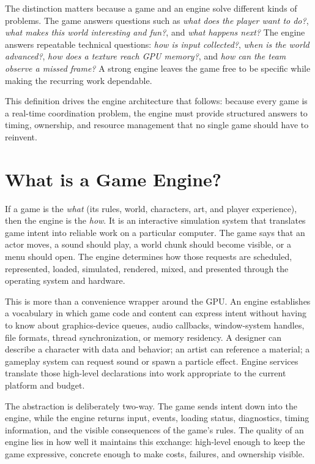 \documentclass[
  11pt,
  letterpaper,
  DIV=11,
  numbers=noendperiod,
  twoside,
  open=right]{scrreprt}
\begin{document}
The distinction matters because a game and an engine solve different
kinds of problems. The game answers questions such as \emph{what does
the player want to do?}, \emph{what makes this world interesting and
fun?}, and \emph{what happens next?} The engine answers repeatable
technical questions: \emph{how is input collected?}, \emph{when is the
world advanced?}, \emph{how does a texture reach GPU memory?}, and
\emph{how can the team observe a missed frame?} A strong engine leaves
the game free to be specific while making the recurring work dependable.

This definition drives the engine architecture that follows: because
every game is a real-time coordination problem, the engine must provide
structured answers to timing, ownership, and resource management that no
single game should have to reinvent.

\section{What is a Game Engine?}\label{what-is-a-game-engine}

If a game is the \emph{what} (its rules, world, characters, art, and
player experience), then the engine is the \emph{how}. It is an
interactive simulation system that translates game intent into reliable
work on a particular computer. The game says that an actor moves, a
sound should play, a world chunk should become visible, or a menu should
open. The engine determines how those requests are scheduled,
represented, loaded, simulated, rendered, mixed, and presented through
the operating system and hardware.

This is more than a convenience wrapper around the GPU. An engine
establishes a vocabulary in which game code and content can express
intent without having to know about graphics-device queues, audio
callbacks, window-system handles, file formats, thread synchronization,
or memory residency. A designer can describe a character with data and
behavior; an artist can reference a material; a gameplay system can
request sound or spawn a particle effect. Engine services translate
those high-level declarations into work appropriate to the current
platform and budget.

The abstraction is deliberately two-way. The game sends intent down into
the engine, while the engine returns input, events, loading status,
diagnostics, timing information, and the visible consequences of the
game's rules. The quality of an engine lies in how well it maintains
this exchange: high-level enough to keep the game expressive, concrete
enough to make costs, failures, and ownership visible.
\end{document}
